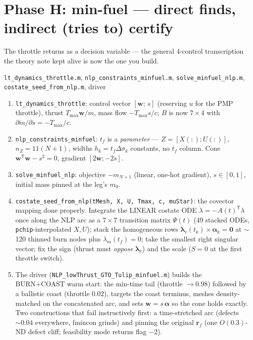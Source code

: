 \documentclass[11pt,letterpaper]{article}
\newcommand{\T}{^{\mathsf{T}}}
\newcommand{\rvec}{\mathbf{r}}
\newcommand{\lamv}{\bm{\lambda}_v}
\newcommand{\lamm}{\lambda_m}
\begin{document}
\section{Phase H: min-fuel --- direct finds, indirect (tries to) certify}

The throttle returns as a decision variable --- the general 4-control
transcription the theory note kept alive is now the one you build.

\begin{exercise}{\texttt{lt\_dynamics\_throttle.m}, \texttt{nlp\_constraints\_minfuel.m}, \texttt{solve\_minfuel\_nlp.m}, \texttt{costate\_seed\_from\_nlp.m}, driver}
\begin{enumerate}[leftmargin=1.5em,nosep]
\item \texttt{lt\_dynamics\_throttle}: control vector $[\mathbf w;\,s]$
      (reserving $u$ for the PMP throttle),
      thrust $T_{\max}\mathbf w/m$, mass flow $-T_{\max}s/c$; $B$ is now
      $7\times4$ with $\partial\dot m/\partial s = -T_{\max}/c$.
\item \texttt{nlp\_constraints\_minfuel}: $t_f$ is a \emph{parameter} ---
      $Z = [X(:); U(:)]$, $n_Z = 11(N{+}1)$, widths
      $h_k = t_f\Delta\sigma_k$ constants, no $t_f$ column. Cone
      $\mathbf w\T\mathbf w - s^2 = 0$, gradient $[2\mathbf w; -2s]$.
\item \texttt{solve\_minfuel\_nlp}: objective $-m_{N+1}$ (linear,
      one-hot gradient), $s \in [0,1]$, initial mass pinned at the leg's
      $m_0$.
\item \texttt{costate\_seed\_from\_nlp(tMesh, X, U, Tmax, c, muStar)}:
      the covector mapping done properly. Integrate the LINEAR costate
      ODE $\dot\lambda = -A(t)\T\lambda$ once along the NLP arc as a
      $7\times7$ transition matrix $\Psi(t)$ (49 stacked ODEs,
      \texttt{pchip}-interpolated $X, U$); stack the homogeneous rows
      $\lamv(t_k)\times\bm\alpha_k = \mathbf 0$ at $\sim$120 thinned
      burn nodes plus $\lamm(t_f) = 0$; take the smallest right
      singular vector; fix the sign (thrust must \emph{oppose}
      $\lamv$) and the scale ($S = 0$ at the first throttle switch).
\item The driver (\texttt{NLP\_lowThrust\_GTO\_Tulip\_minfuel.m})
      builds the BURN+COAST warm start: the min-time tail
      (throttle $\to 0.98$) followed by a ballistic coast (throttle
      $0.02$), targets the coast terminus, meshes density-matched on the
      concatenated arc, and sets $\mathbf w = s\,\bm\alpha$ so the cone
      holds exactly. Two constructions that fail instructively first: a
      time-stretched arc (defects $\sim 0.04$ everywhere, fmincon
      grinds) and pinning the original $\rvec_f$ (one $O(0.3)$-ND defect
      cliff; feasibility mode returns flag $-2$).
\end{enumerate}
\end{exercise}
\end{document}
